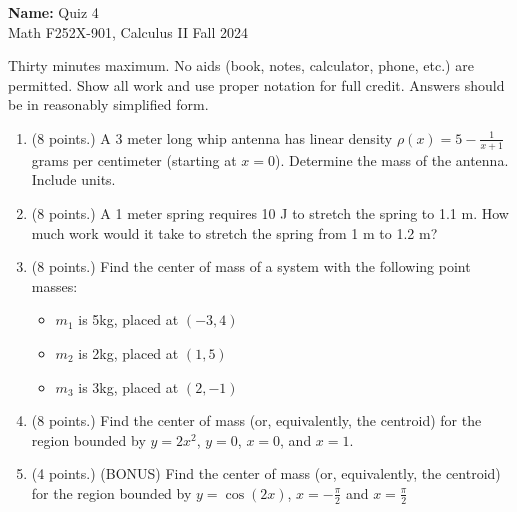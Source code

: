 \documentclass[12pt]{article}
\newcommand{\ds}{\displaystyle}
\newcommand{\points}[1]{(#1 points.)}		%
\begin{document}
\pagestyle{plain}

\noindent \textbf{Name:} \underline{\hspace{15em}}		\hfill	Quiz 4 \\
           Math F252X-901, Calculus II  			\hfill	Fall 2024 	

                \vspace{1cm}
                
Thirty minutes maximum. No aids (book, notes,
calculator, phone, etc.) are permitted. Show all work and use proper
notation for full credit. Answers should be in reasonably simplified
form.

\begin{enumerate}

\item \points{8} A 3 meter long whip antenna has linear density $\ds \rho(x) =
  5-\frac{1}{x+1}$ grams per centimeter (starting at $x=0$). Determine
  the mass of the antenna. Include units.
    
  \vfill

\item \points{8} A 1 meter spring requires 10 J to stretch the spring to 1.1
  m. How much work would it take to stretch the spring from 1 m to 1.2
  m?
  \vfill

  \newpage

\item \points{8} Find the center of mass of a system with the following point masses:
  \begin{itemize}
  \item $m_1$ is 5kg, placed at $(-3,4)$
  \item $m_2$ is 2kg, placed at $(1,5)$
  \item $m_3$ is 3kg, placed at $(2,-1)$
  \end{itemize}

  \vfill

\item \points{8} Find the center of mass (or, equivalently, the centroid) for
  the region bounded by $y=2x^2$, $y=0$, $x=0$, and $x=1$.
    
  \vfill

  \newpage

\item \points{4} (BONUS) Find the center of mass (or, equivalently, the
  centroid) for the region bounded by $y=\cos(2x)$, $x=-\frac{\pi}{2}$
  and $x=\frac{\pi}{2}$

  \vfill
  
\end{enumerate}
\end{document}
